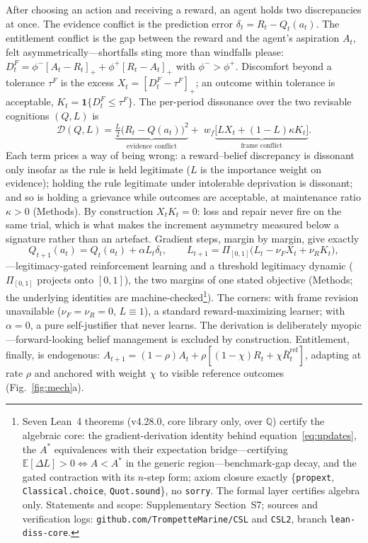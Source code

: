 \documentclass[11pt]{article}
\newcommand{\E}{\mathbb{E}}
\newcommand{\1}{\mathbf{1}}
\newcommand{\Astar}{A^{*}}
\begin{document}
After choosing an action and receiving a reward, an agent holds two discrepancies at once. The evidence conflict is the prediction error $\delta_t=R_t-Q_t(a_t)$. The entitlement conflict is the gap between the reward and the agent's aspiration $A_t$, felt asymmetrically---shortfalls sting more than windfalls please: $D^F_t=\phi^-[A_t-R_t]_+ + \phi^+[R_t-A_t]_+$ with $\phi^->\phi^+$. Discomfort beyond a tolerance $\tau^F$ is the excess $X_t=[D^F_t-\tau^F]_+$; an outcome within tolerance is acceptable, $K_t=\1\{D^F_t\le\tau^F\}$. The per-period dissonance over the two revisable cognitions $(Q,L)$ is
\begin{equation}
\mathcal D(Q,L)=\underbrace{\tfrac{L}{2}\big(R_t-Q(a_t)\big)^2}_{\text{evidence conflict}}+\;w_f\underbrace{\big[L X_t+(1-L)\kappa K_t\big]}_{\text{frame conflict}}.
\label{eq:D}
\end{equation}
Each term prices a way of being wrong: a reward--belief discrepancy is dissonant only insofar as the rule is held legitimate ($L$ is the importance weight on evidence); holding the rule legitimate under intolerable deprivation is dissonant; and so is holding a grievance while outcomes are acceptable, at maintenance ratio $\kappa>0$ (Methods). By construction $X_tK_t=0$: loss and repair never fire on the same trial, which is what makes the increment asymmetry measured below a signature rather than an artefact. Gradient steps, margin by margin, give exactly
\begin{equation}
Q_{t+1}(a_t)=Q_t(a_t)+\alpha L_t\delta_t,\qquad
L_{t+1}=\Pi_{[0,1]}\big(L_t-\nu_F X_t+\nu_R K_t\big),
\label{eq:updates}
\end{equation}
---legitimacy-gated reinforcement learning and a threshold legitimacy dynamic ($\Pi_{[0,1]}$ projects onto $[0,1]$), the two margins of one stated objective (Methods; the underlying identities are machine-checked\footnote{Seven Lean~4 theorems (v4.28.0, core library only, over $\mathbb Q$) certify the algebraic core: the gradient-derivation identity behind equation~\eqref{eq:updates}, the $\Astar$ equivalences with their expectation bridge---certifying $\E[\Delta L]>0\iff A<\Astar$ in the generic region---benchmark-gap decay, and the gated contraction with its $n$-step form; axiom closure exactly \{\texttt{propext}, \texttt{Classical.choice}, \texttt{Quot.sound}\}, no \texttt{sorry}. The formal layer certifies algebra only. Statements and scope: Supplementary Section~S7; sources and verification logs: \texttt{github.com/TrompetteMarine/CSL} and \texttt{CSL2}, branch \texttt{lean-diss-core}.}). The corners: with frame revision unavailable ($\nu_F=\nu_R=0$, $L\equiv1$), a standard reward-maximizing learner; with $\alpha=0$, a pure self-justifier that never learns. The derivation is deliberately myopic---forward-looking belief management\cite{BenabouTirole2002,Benabou2016} is excluded by construction. Entitlement, finally, is endogenous: $A_{t+1}=(1-\rho)A_t+\rho[(1-\chi)R_t+\chi\bar R^{\mathrm{ref}}_t]$, adapting at rate $\rho$ and anchored with weight $\chi$ to visible reference outcomes (Fig.~\ref{fig:mech}a).
\end{document}
